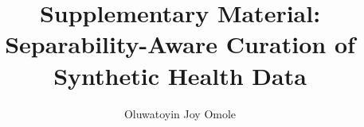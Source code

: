 \documentclass[11pt]{article}
\begin{document}
\title{Supplementary Material: Separability-Aware Curation of Synthetic Health Data}
\author{Oluwatoyin Joy Omole}
\date{}
\maketitle

\end{document}
